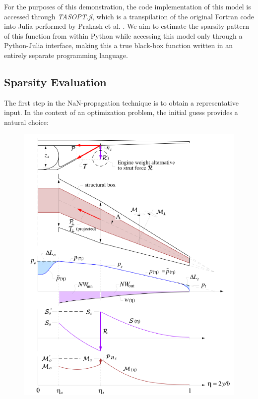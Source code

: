 For the purposes of this demonstration, the code implementation of this model is accessed through \emph{TASOPT.jl}, which is a transpilation of the original Fortran code into Julia performed by Prakash et al. \cite{tasopt_jl}. We aim to estimate the sparsity pattern of this function from within Python while accessing this model only through a Python-Julia interface, making this a true black-box function written in an entirely separate programming language.

\subsection{Sparsity Evaluation}

The first step in the NaN-propagation technique is to obtain a representative input. In the context of an optimization problem, the initial guess provides a natural choice:

\begin{figure}[H]
    \centering
    \includegraphics[page=2, width=5in]{../figures/nan-propagation/cropped.pdf}
\end{figure}

